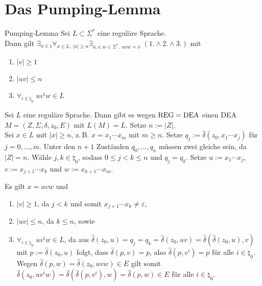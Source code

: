\pagebreak

\section{%
    Das Pumping-Lemma%
}

\begin{Satz}{Pumping-Lemma}
    Sei $L \subset \Sigma^\ast$ eine reguläre Sprache.\\
    Dann gilt
    $\exists_{n \in \natural} \forall_{x \in L,\; |x| \ge n}
    \exists_{u, v, w \in \Sigma^\ast,\; uvw = x}\; (1. \land 2. \land 3.)$ mit
    \begin{enumerate}
        \item
        $|v| \ge 1$

        \item
        $|uv| \le n$

        \item
        $\forall_{i \in \natural_0}\; u v^i w \in L$
    \end{enumerate}
\end{Satz}

\begin{Beweis}
    Sei $L$ eine reguläre Sprache.
    Dann gibt es wegen $\text{REG} = \text{DEA}$ einen DEA\\
    $M = (Z, \Sigma, \delta, z_0, E)$ mit $L(M) = L$.
    Setze $n := |Z|$.\\
    Sei $x \in L$ mit $|x| \ge n$, z.\,B. $x = x_1 \dotsb x_m$ mit $m \ge n$.
    Setze $q_j := \widehat{\delta}(z_0, x_1 \dotsb x_j)$ für
    $j = 0, \dotsc, m$.
    Unter den $n + 1$ Zuständen $q_0, \dotsc, q_n$ müssen zwei gleiche sein,
    da $|Z| = n$.
    Wähle $j, k \in \natural_0$, sodass $0 \le j < k \le n$ und $q_j = q_k$.
    Setze $u := x_1 \dotsb x_j$, $v := x_{j+1} \dotsb x_k$ und
    $w := x_{k+1} \dotsb x_m$.

    Es gilt $x = uvw$ und
    \begin{enumerate}
        \item
        $|v| \ge 1$, da $j < k$ und somit
        $x_{j+1} \dotsb x_k \not= \varepsilon$,

        \item
        $|uv| \le n$, da $k \le n$, sowie

        \item
        $\forall_{i \in \natural_0}\; u v^i w \in L$, da aus
        $\widehat{\delta}(z_0, u) = q_j = q_k = \widehat{\delta}(z_0, uv) =
        \widehat{\delta}(\widehat{\delta}(z_0, u), v)$
        mit $p := \widehat{\delta}(z_0, u)$ folgt, dass
        $\widehat{\delta}(p, v) = p$,
        also $\widehat{\delta}(p, v^i) = p$ für alle $i \in \natural_0$.
        Wegen $\widehat{\delta}(p, w) = \widehat{\delta}(z_0, uvw) \in E$
        gilt somit $\widehat{\delta}(z_0, u v^i w) =
        \widehat{\delta}(\widehat{\delta}(p, v^i), w) =
        \widehat{\delta}(p, w) \in E$ für alle $i \in \natural_0$.
    \end{enumerate}
\end{Beweis}

